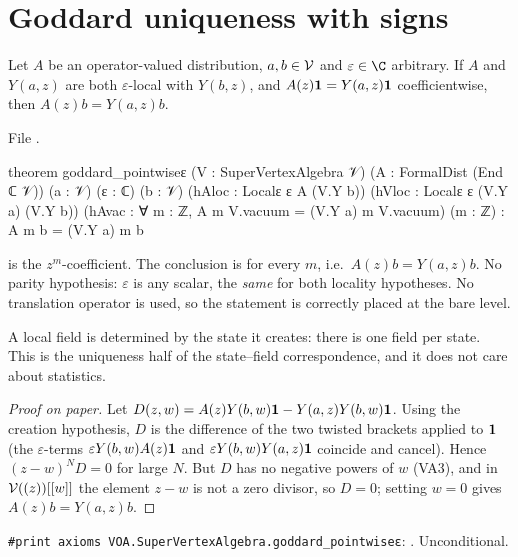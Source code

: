 \section{Goddard uniqueness with signs}\label{l17:sec:goddard}

\begin{theorem}\label{l17:thm:goddardpt}
Let $A$ be an operator-valued distribution, $a,b\in\mathcal{V}$ and $\varepsilon\in\C$ arbitrary. If
$A$ and $Y(a,z)$ are both $\varepsilon$-local with $Y(b,z)$, and $A(z)\mathbf{1}=Y(a,z)\mathbf{1}$
coefficientwise, then $A(z)b=Y(a,z)b$.
\end{theorem}
\noindent File .
\begin{leancode}
theorem goddard_pointwiseε (V : SuperVertexAlgebra 𝒱) (A : FormalDist (End ℂ 𝒱)) (a : 𝒱)
    (ε : ℂ) (b : 𝒱) (hAloc : Localε ε A (V.Y b)) (hVloc : Localε ε (V.Y a) (V.Y b))
    (hAvac : ∀ m : ℤ, A m V.vacuum = (V.Y a) m V.vacuum) (m : ℤ) :
    A m b = (V.Y a) m b
\end{leancode}
\begin{dictionary}
 is the $z^m$-coefficient. The conclusion is for every $m$, i.e.\ $A(z)b=Y(a,z)b$. No
parity hypothesis: $\varepsilon$ is any scalar, the \emph{same} for both locality hypotheses. No
translation operator is used, so the statement is correctly placed at the bare level.
\end{dictionary}
\begin{physics}
A local field is determined by the state it creates: there is one field per state. This is the
uniqueness half of the state--field correspondence, and it does not care about statistics.
\end{physics}
\begin{proof}[Proof on paper]
Let $D(z,w)=A(z)Y(b,w)\mathbf{1}-Y(a,z)Y(b,w)\mathbf{1}$. Using the creation hypothesis,
$D$ is the difference of the two twisted brackets applied to $\mathbf{1}$ (the $\varepsilon$-terms
$\varepsilon Y(b,w)A(z)\mathbf{1}$ and $\varepsilon Y(b,w)Y(a,z)\mathbf{1}$ coincide and
cancel). Hence $(z-w)^ND=0$ for large $N$. But $D$ has no negative powers of $w$ (VA3), and in
$\mathcal{V}((z))[[w]]$ the element $z-w$ is not a zero divisor, so $D=0$; setting $w=0$ gives
$A(z)b=Y(a,z)b$.
\end{proof}
\begin{status}
\texttt{\#print axioms VOA.SuperVertexAlgebra.goddard\_pointwiseε}: . Unconditional.
\end{status}

